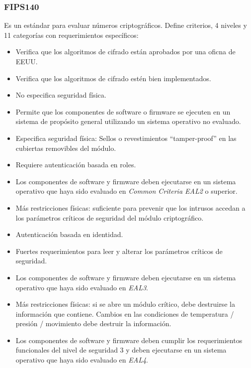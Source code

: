 \subsubsection{FIPS140}
Es un estándar para evaluar números criptográficos. Define criterios, 4 niveles y 11 categorías con requerimientos específicos:

\vspace{-2em}
\begin{itemize}
	\item Verifica que los algoritmos de cifrado están aprobados por una oficna de EEUU.
	\item Verifica que los algoritmos de cifrado estén bien implementados.
	\item No especifica seguridad física.
	\item Permite que los componentes de software o firmware se ejecuten en un sistema de propósito general utilizando un sistema operativo no evaluado.
\end{itemize}

\vspace{-2em} 
\begin{itemize}
	\item Especifica seguridad física: Sellos o revestimientos ``tamper-proof'' en las cubiertas removibles del módulo.
	\item Requiere autenticación basada en roles.
	\item Los componentes de software y firmware deben ejecutarse en un sistema operativo que haya sido evaluado en \emph{Common Criteria EAL2} o superior.
\end{itemize}

\vspace{-2em} 
\begin{itemize}
	\item Más restricciones físicas: suficiente para prevenir que los intrusos accedan a los parámetros críticos de seguridad del módulo criptográfico.
	\item Autenticación basada en identidad.
	\item Fuertes requerimientos para leer y alterar los parámetros críticos de seguridad.
	\item Los componentes de software y firmware deben ejecutarse en un sistema operativo que haya sido evaluado en \emph{EAL3}.
\end{itemize}

\vspace{-2em} 
\begin{itemize}
	\item Más restricciones físicas: si se abre un módulo crítico, debe destruirse la información que contiene. Cambios en las condiciones de temperatura / presión / movimiento debe destruir la información.
	\item Los componentes de software y firmware deben cumplir los requerimientos funcionales del nivel de seguridad 3 y deben ejecutarse en un sistema operativo que haya sido evaluado en \emph{EAL4}.
\end{itemize}


